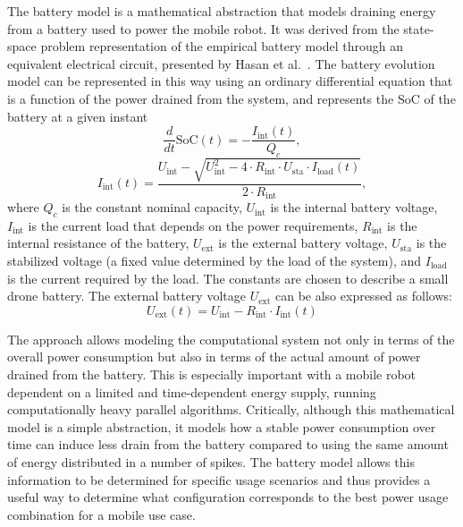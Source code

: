 The battery model is a mathematical abstraction that models draining energy from a battery used to power the mobile robot. It was derived from the state-space problem representation of the empirical battery model through an equivalent electrical circuit, presented by Hasan et al.~\cite{hasan2018exogenous}. The battery evolution model can be represented in this way using an ordinary differential equation that is a function of the power drained from the system, and represents the SoC of the battery at a given instant
\begin{equation}\label{eq:battery-model-1}
  \frac{d}{dt}\mathrm{SoC}(t)=-\frac{I_\mathrm{int}(t)}{Q_c},
\end{equation}
\begin{equation}\label{eq:battery-model-2}
  I_\mathrm{int}(t)=
    \frac{U_\mathrm{int}-
    \sqrt{
      U_\mathrm{int}^2-
      4\cdot R_{\mathrm{int}}\cdot U_\mathrm{sta}\cdot I_{\mathrm{load}}(t)}
    }{2\cdot R_\mathrm{int}},
\end{equation}
where $Q_c$ is the constant nominal capacity, $U_\mathrm{int}$ is the internal battery voltage, $I_\mathrm{int}$ is the current load that depends on the power requirements, $R_\mathrm{int}$ is the internal resistance of the battery, $U_\mathrm{ext}$ is the external battery voltage, $U_{\mathrm{sta}}$ is the stabilized voltage (a fixed value determined by the load of the system), and $I_\mathrm{load}$ is the current required by the load. The constants are chosen to describe a small drone battery. The external battery voltage $U_{\mathrm{ext}}$ can be also expressed as follows:
\begin{equation}
U_{\mathrm{ext}}(t)=U_{\mathrm{int}}-R_{\mathrm{int}}\cdot I_{\mathrm{int}}(t)
\end{equation}

The approach allows modeling the computational system not only in terms of the overall power consumption but also in terms of the actual amount of power drained from the battery. This is especially important with a mobile robot dependent on a limited and time-dependent energy supply, running computationally heavy parallel algorithms. Critically, although this mathematical model is a simple abstraction, it models how a stable power consumption over time can induce less drain from the battery compared to using the same amount of energy distributed in a number of spikes. The battery model allows this information to be determined for specific usage scenarios and thus provides a useful way to determine what configuration corresponds to the best power usage combination for a mobile use case.



